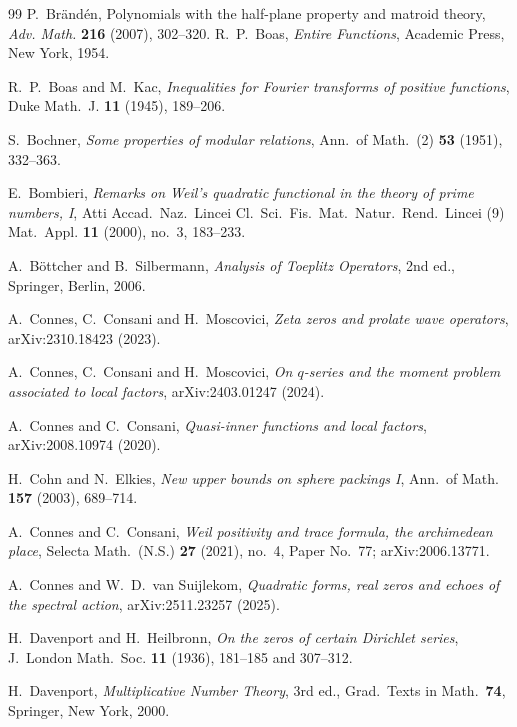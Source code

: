 \documentclass[11pt]{amsart}
\theoremstyle{definition}
\theoremstyle{remark}
\begin{document}
\begin{thebibliography}{99}
 P.~Br\"and\'en, Polynomials with the half-plane property and matroid theory, \emph{Adv. Math.} \textbf{216} (2007), 302--320.
 R.~P.~Boas, \emph{Entire Functions}, Academic Press, New York, 1954.

 R.~P.~Boas and M.~Kac, \emph{Inequalities for Fourier transforms of positive
functions}, Duke Math.~J. \textbf{11} (1945), 189--206.

 S.~Bochner, \emph{Some properties of modular relations}, Ann.\ of Math.\ (2) \textbf{53} (1951), 332--363.

 E.~Bombieri, \emph{Remarks on Weil's quadratic functional in the theory of
prime numbers, I}, Atti Accad.~Naz.~Lincei Cl.~Sci.~Fis.~Mat.~Natur.~Rend.~Lincei (9) Mat.~Appl.
\textbf{11} (2000), no.~3, 183--233.

 A.~B\"ottcher and B.~Silbermann, \emph{Analysis of Toeplitz Operators}, 2nd ed., Springer, Berlin, 2006.

 A.~Connes, C.~Consani and H.~Moscovici, \emph{Zeta zeros and prolate wave operators}, arXiv:2310.18423 (2023).

 A.~Connes, C.~Consani and H.~Moscovici, \emph{On $q$-series and the moment problem associated to local factors}, arXiv:2403.01247 (2024).

 A.~Connes and C.~Consani, \emph{Quasi-inner functions and local factors}, arXiv:2008.10974 (2020).

 H.~Cohn and N.~Elkies, \emph{New upper bounds on sphere packings I},
Ann.~of Math. \textbf{157} (2003), 689--714.

 A.~Connes and C.~Consani, \emph{Weil positivity and trace formula, the archimedean place}, Selecta Math.\ (N.S.) \textbf{27} (2021), no.~4, Paper No.~77; arXiv:2006.13771.

 A.~Connes and W.~D.~van Suijlekom, \emph{Quadratic forms, real zeros and echoes of the spectral action}, arXiv:2511.23257 (2025).

 H.~Davenport and H.~Heilbronn, \emph{On the zeros of certain
Dirichlet series}, J.~London Math.~Soc. \textbf{11} (1936), 181--185 and 307--312.

 H.~Davenport, \emph{Multiplicative Number Theory}, 3rd ed., Grad.\ Texts in Math.\ \textbf{74}, Springer, New York, 2000.


\end{thebibliography}
\end{document}
